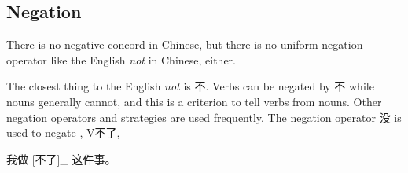 \documentclass[../main.tex]{subfiles}
\begin{document}
\subsection{Negation}

There is no negative concord in Chinese, 
but there is no uniform negation operator like the English \emph{not} in Chinese, either. 

The closest thing to the English \emph{not} is 不. 
Verbs can be negated by 不 while nouns generally cannot, 
and this is a criterion to tell verbs from nouns. 
Other negation operators and strategies are used frequently.
The negation operator 没 is used to negate , V不了, 

\begin{exe}
    \ex \begin{xlist}
        \ex 我做 [不了]_{} 这件事。
    \end{xlist}    
\end{exe}
\end{document}
